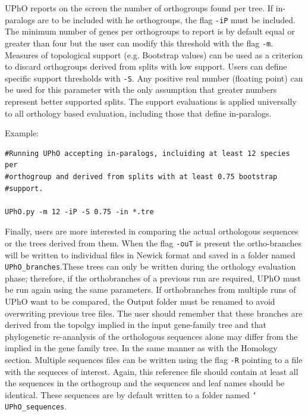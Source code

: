 \documentclass[10pt]{article}
\begin{document}
UPhO reports on the screen the number of orthogroups found per
tree. If in-paralogs are to be included with he orthogroups, the flag
\texttt{-iP} must be included. The minimum number of genes  per  orthogroups to
report is by default equal or greater than four but the user can modify
this threshold with the flag \texttt{-m}. Measures of topological
support (e.g. Bootstrap values) can be used as a criterion to discard
orthogroups derived from splits with low support. Users can define
specific support thresholds with \texttt{-S}. Any positive real number
(floating point) can be used for this parameter with the only assumption that greater
numbers represent better supported splits. The support evaluations is
applied universally to all orthology based evaluation, including those
that define in-paralogs.

Example:
\begin{lstlisting} 
#Running UPhO accepting in-paralogs, incluiding at least 12 species per
#orthogroup and derived from splits with at least 0.75 bootstrap
#support.

UPhO.py -m 12 -iP -S 0.75 -in *.tre

\end{lstlisting}
 
Finally, users are more interested in comparing the actual orthologous sequences
or the trees derived from them. When the flag
\texttt{-ouT} is present the ortho-branches will be written to
individual files in Newick format and saved  in a folder named
\texttt{UPhO\_branches}.These trees can only be written during the
orthology evaluation phase; therefore, if the orthobranches of a previous run
are required, UPhO must be run again using the same parameters. If
orthobranches from multiple runs of UPhO want to be compared, the
Output folder must be renamed to avoid overwriting previous tree
files. The user should remember that these branches are derived from
the topolgy implied in the input gene-family tree and that phylogenetic 
re-ananlysis  of the orthologous sequences alone may differ from the
implied in the gene family tree.  In the same manner as with the
Homology section. Multiple sequences files can be written using the
flag \texttt{-R} pointing to a file with the sequeces of
interest. Again, this reference file should contain at least all the
sequences in the orthogroup and the sequences and leaf names should be
identical. These sequences are by default written to a folder named
\texttt{\char`\\UPhO\_sequences}.
\end{document}
